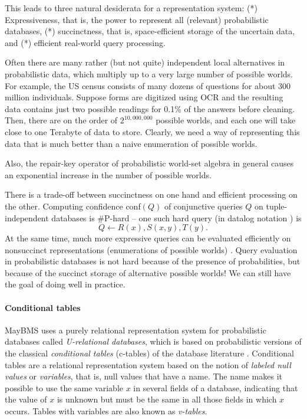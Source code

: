 This leads to three natural desiderata for a representation system:
(*) Expressiveness, that is, the power to represent all (relevant) probabilistic databases,
(*) succinctness, that is, space-efficient storage of the uncertain data,
and (*) efficient real-world query processing.

Often there are many rather (but not quite) independent
local alternatives in probabilistic data, which multiply up to a very large number of possible worlds.
For example, the US census consists of many dozens of questions for about 300 million individuals.
Suppose forms are digitized using OCR and the resulting data contains just
two possible readings for 0.1\% of the answers before cleaning.
Then, there are on the order of $2^{10,000,000}$ possible worlds, and each one will take
close to one Terabyte of data to store. 
Clearly, we need a way of representing this data that is much better than a naive enumeration of possible worlds.

Also, the repair-key operator of probabilistic world-set algebra in general causes an exponential increase in the number of possible worlds.

There is a trade-off between succinctness on one hand and efficient processing on the other.
Computing confidence conf$(Q)$ of conjunctive queries $Q$ on tuple-independent databases
is \#P-hard -- one such hard query \cite{dalvi07efficient} (in datalog notation \cite{AHV95}) is
\[
Q \leftarrow R(x), S(x,y), T(y).
\]
At the same time, much more expressive queries can be evaluated efficiently on nonsuccinct representations (enumerations of possible worlds) \cite{AKO07ISQL}. Query evaluation in probabilistic databases is not hard because of the presence of probabilities, but because of the succinct storage of alternative possible worlds!
We can still have the goal of doing well in practice.


\paragraph{Conditional tables}
MayBMS uses a purely relational representation system for probabilistic databases called {\em U-relational databases}\/, which is based
on probabilistic versions of the classical {\em conditional tables}\/ (c-tables) of the database literature \cite{IL1984}.
Conditional tables are a relational representation system based on the notion of {\em labeled null values}\/ or {\em variables}\/, that is, null values that have a name. The name makes it possible to use the same variable $x$ in several fields of a database, indicating that the value of $x$ is unknown but must be the same in all those fields in which $x$ occurs. Tables with variables are also known as {\em v-tables}\/.


